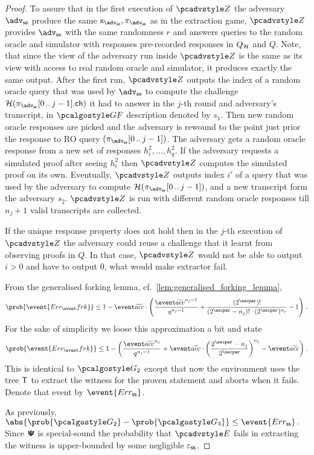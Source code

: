 \let\accentvec\vec \documentclass[runningheads]{llncs}
\begin{document}
\begin{proof}
To assure that in the first execution of $\zdv$ the adversary $\advse$ produce
the same $\inp_\advse, \zkproof_\advse$ as in the extraction game, $\zdv$
provides $\advse$ with the same randomness $r$ and answers queries to the random
oracle and simulator with responses pre-recorded responses in $Q_{\mathcal{H}}$ and $Q$.
%
Note, that since the view of the adversary run inside $\zdv$ is the same as its
view with access to real random oracle and simulator, it produces exactly the
same output. After the first run, $\zdv$ outputs the index of a random oracle
query that was used by $\advse$ to compute the challenge
$\ro(\zkproof_\advse\range{0}{j - 1}.\ch)$ it had to answer in the $j$-th round
and adversary's transcript, in $\genforking$ description denoted by $s_1$. Then
new random oracle responses are picked and the adversary is rewound to the point
just prior the response to RO query $(\zkproof_\advse\range{0}{j - 1})$. The
adversary gets a random oracle response from a new set of responses $h^2_i,
\ldots, h^2_q$. If the adversary requests a simulated proof after seeing $h^2_i$
then $\zdv$ computes the simulated proof on its own. Eventually, $\zdv$ outputs
index $i'$ of a query that was used by the adversary to compute
$\ro(\zkproof_\advse\range{0}{j - 1})$, and a new transcript form the adversary
$s_2$. $\zdv$ is run with different random oracle responses till $n_j + 1$ valid
transcripts are collected.

If the unique response property does not hold then in the $j$-th execution of
$\zdv$ the adversary could reuse a challenge that it learnt from observing
proofs in $Q$. In that case, $\zdv$ would not be able to output $i>0$ and have
to output $0$, what would make extractor fail.

From the generalised forking lemma,
cf.~\cref{lem:generalised_forking_lemma}, \[
	\prob{\event{\errfrk}} \leq 1 -
	\waccProb \cdot \left(\frac{\waccProb^{n_j - 1}}{q^{n_j - 1}} +
	\frac{(2^\secpar) !}{(2^\secpar - n_j)! \cdot
(2^\secpar)^{n_j}} - 1\right)\,.
\]
For the sake of simplicity we loose this approximation a bit and state
\[
	\prob{\event{\errfrk}} \leq 1 -
	\left(\frac{\waccProb^{n_j}}{q^{n_j - 1}} +
		\waccProb \cdot \left(\frac{2^\secpar - n_j}{2^\secpar}\right)^{n_j} -
	\waccProb\right)\,.
\]
 This is identical to $\game{2}$ except that now the environment uses
the tree $\mathsf{T}$ to extract the witness for the proven statement and aborts when
it fails. Denote that event by $\event{\errss}$.

As previously, 
\(
	\abs{\prob{\game{2}} - \prob{\game{3}}} \leq \event{\errss}\,.
	\)
Since $\bm{\mathsf{\Psi}}$ is special-sound the probability that $\env$ fails in extracting
the witness is upper-bounded by some negligible $\varepsilon_{\mathsf{ss}}$.


\end{proof}
\end{document}
